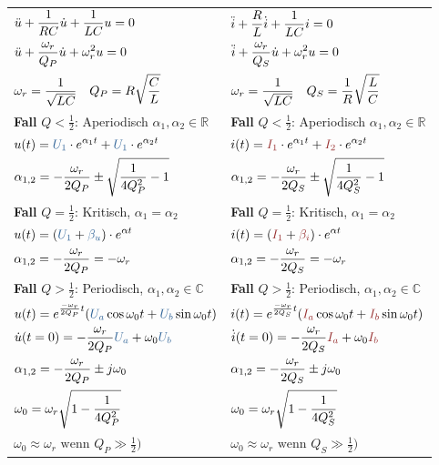 \documentclass{article}
\begin{document}
\begin{twocolumn}
\begin{tabularx}{\columnwidth}{Y|Y}
  $\displaystyle \ddot{u} + \frac{1}{RC} \dot{u} + \frac{1}{LC}u = 0$ &
  $\displaystyle \ddot{i} + \frac{R}{L} \dot{i} + \frac{1}{LC}i = 0$ \\
  $\displaystyle \ddot{u} + \frac{\omega_r}{Q_P} \dot{u} + \omega_r^2 u = 0$ &
  $\displaystyle \ddot{i} + \frac{\omega_r}{Q_S} \dot{u} + \omega_r^2 u = 0$ \\
  $\displaystyle \omega_r = \frac{1}{\sqrt{LC}} \quad Q_P = R \sqrt{\frac{C}{L}}$ &
  $\displaystyle \omega_r = \frac{1}{\sqrt{LC}} \quad Q_S = \frac{1}{R} \sqrt{\frac{L}{C}}$  \\
  \textbf{Fall} $Q < \frac{1}{2}$: Aperiodisch $\alpha_1, \alpha_2 \in \mathbb{R}$  &
  \textbf{Fall} $Q < \frac{1}{2}$: Aperiodisch $\alpha_1, \alpha_2 \in \mathbb{R}$ \\
  $\fmm u(t) = \textcolor{cBlue}{U_1} \cdot e^{\alpha_1 t} + \textcolor{cBlue}{U_1} \cdot
  e^{\alpha_2 t}$ & 
  $\fmm i(t) = \textcolor{cRed}{I_1} \cdot e^{\alpha_1 t} + \textcolor{cRed}{I_2} \cdot
  e^{\alpha_2 t}$ \\
  $\displaystyle \alpha_{1,2} = -\frac{\omega_r}{2Q_P} \pm \sqrt{\frac{1}{4Q_P^2}-1}$ &
  $\displaystyle \alpha_{1,2} = -\frac{\omega_r}{2Q_S} \pm \sqrt{\frac{1}{4Q_S^2}-1}$ \\
  \textbf{Fall} $Q = \frac{1}{2}$: Kritisch, $\alpha_1 = \alpha_2$ &
  \textbf{Fall} $Q = \frac{1}{2}$: Kritisch, $\alpha_1 = \alpha_2$ \\
  $\fmm u(t) = (\textcolor{cBlue}{U_1} + \textcolor{cBlue}{\beta_u}) \cdot e^{\alpha t}$ &
  $\fmm i(t) = (\textcolor{cRed}{I_1} + \textcolor{cRed}{\beta_i}) \cdot e^{\alpha t}$ \\
  $\displaystyle \alpha_{1,2} = -\frac{\omega_r}{2Q_P} = -\omega_r$ &
  $\displaystyle \alpha_{1,2} = -\frac{\omega_r}{2Q_S} = -\omega_r$ \\
  \textbf{Fall} $Q > \frac{1}{2}$: Periodisch, $\alpha_1, \alpha_2 \in \mathbb{C}$ &  
  \textbf{Fall} $Q > \frac{1}{2}$: Periodisch, $\alpha_1, \alpha_2 \in \mathbb{C}$ \\
  $\fmm u(t) = e^{\frac{-\omega_r}{2 Q_P} t} (\textcolor{cBlue}{U_a} \cos{\omega_0
  t} + \textcolor{cBlue}{U_b} \sin{\omega_0 t})$ &
  $\fmm i(t) = e^{\frac{-\omega_r}{2 Q_S} t} (\textcolor{cRed}{I_a} \cos{\omega_0
  t} + \textcolor{cRed}{I_b} \sin{\omega_0 t})$ \\
  $\fmm \dot{u}(t = 0) = - \frac{\omega_r}{2Q_P} \textcolor{cBlue}{U_a} + \omega_0
  \textcolor{cBlue}{U_b}$ &
  $\fmm \dot{i}(t = 0) = - \frac{\omega_r}{2Q_S} \textcolor{cRed}{I_a} + \omega_0
  \textcolor{cRed}{I_b}$ \\
  $\displaystyle \alpha_{1,2} = -\frac{\omega_r}{2 Q_P} \pm j \omega_0$ &
  $\displaystyle \alpha_{1,2} = -\frac{\omega_r}{2 Q_S} \pm j \omega_0$ \\
  $\displaystyle \omega_0 = \omega_r \sqrt{1-\frac{1}{4 Q_P^2}}$ &
  $\displaystyle \omega_0 = \omega_r \sqrt{1-\frac{1}{4 Q_S^2}}$ \\
  $\omega_0 \approx \omega_r \text{ wenn } Q_P \gg \frac{1}{2})$ &
  $\omega_0 \approx \omega_r \text{ wenn } Q_S \gg \frac{1}{2})$
\end{tabularx}


\end{twocolumn}
\end{document}
